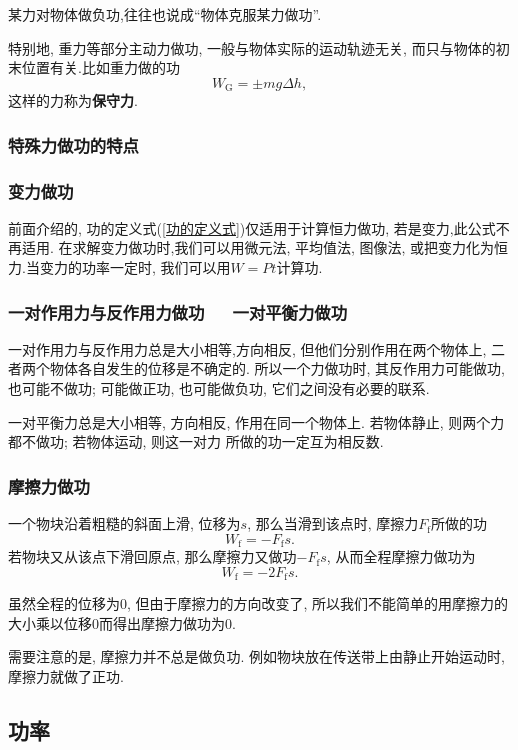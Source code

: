 \documentclass[11pt,a4paper]{ctexart}
\begin{document}
某力对物体做负功,往往也说成``物体克服某力做功''.

特别地, 重力等部分主动力做功, 一般与物体实际的运动轨迹无关, 而只与物体的初末位置有关.比如重力做的功
\begin{equation*}
	W_\mathrm{G} =\pm mg\Delta h,
\end{equation*}
这样的力称为\textbf{保守力}.

\subsubsection{特殊力做功的特点}
\subsubsection*{变力做功}

前面介绍的, 功的定义式(\ref{功的定义式})仅适用于计算恒力做功, 若是变力,此公式不再适用.
在求解变力做功时,我们可以用微元法, 平均值法, 图像法, 或把变力化为恒力.当变力的功率一定时,
我们可以用$W = Pt$计算功.

\subsubsection*{一对作用力与反作用力做功\ \ \ 一对平衡力做功}

一对作用力与反作用力总是大小相等,方向相反, 但他们分别作用在两个物体上, 二者两个物体各自发生的位移是不确定的.
所以一个力做功时, 其反作用力可能做功, 也可能不做功; 可能做正功, 也可能做负功, 它们之间没有必要的联系.

一对平衡力总是大小相等, 方向相反, 作用在同一个物体上. 若物体静止, 则两个力都不做功; 若物体运动, 则这一对力
所做的功一定互为相反数.

\subsubsection*{摩擦力做功}

一个物块沿着粗糙的斜面上滑, 位移为$s$, 那么当滑到该点时, 摩擦力$F_\mathrm{f}$所做的功$$W_\mathrm{f} = -F_\mathrm{f}s.$$
若物块又从该点下滑回原点, 那么摩擦力又做功$-F_\mathrm{f}s$, 从而全程摩擦力做功为$$W_\mathrm{f} = -2F_\mathrm{f}s.$$

虽然全程的位移为0, 但由于摩擦力的方向改变了, 所以我们不能简单的用摩擦力的大小乘以位移0而得出摩擦力做功为0.

需要注意的是, 摩擦力并不总是做负功. 例如物块放在传送带上由静止开始运动时, 摩擦力就做了正功.

\subsection{功率}
\end{document}
